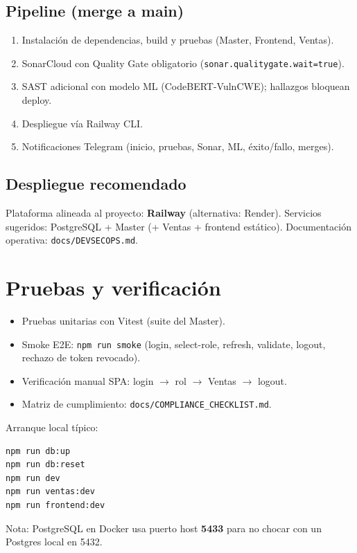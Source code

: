 \documentclass[12pt,a4paper]{article}
\begin{document}
\subsection{Pipeline (merge a main)}
\begin{enumerate}[leftmargin=1.5em]
  \item Instalación de dependencias, build y pruebas (Master, Frontend, Ventas).
  \item SonarCloud con Quality Gate obligatorio (\texttt{sonar.qualitygate.wait=true}).
  \item SAST adicional con modelo ML (CodeBERT-VulnCWE); hallazgos bloquean deploy.
  \item Despliegue vía Railway CLI.
  \item Notificaciones Telegram (inicio, pruebas, Sonar, ML, éxito/fallo, merges).
\end{enumerate}

\subsection{Despliegue recomendado}
Plataforma alineada al proyecto: \textbf{Railway} (alternativa: Render).
Servicios sugeridos: PostgreSQL + Master (+ Ventas + frontend estático).
Documentación operativa: \texttt{docs/DEVSECOPS.md}.

\section{Pruebas y verificación}
\begin{itemize}[leftmargin=1.5em]
  \item Pruebas unitarias con Vitest (suite del Master).
  \item Smoke E2E: \texttt{npm run smoke} (login, select-role, refresh, validate, logout, rechazo de token revocado).
  \item Verificación manual SPA: login $\rightarrow$ rol $\rightarrow$ Ventas $\rightarrow$ logout.
  \item Matriz de cumplimiento: \texttt{docs/COMPLIANCE\_CHECKLIST.md}.
\end{itemize}

Arranque local típico:
\begin{lstlisting}
npm run db:up
npm run db:reset
npm run dev
npm run ventas:dev
npm run frontend:dev
\end{lstlisting}
Nota: PostgreSQL en Docker usa puerto host \textbf{5433} para no chocar con un Postgres local en 5432.
\end{document}
